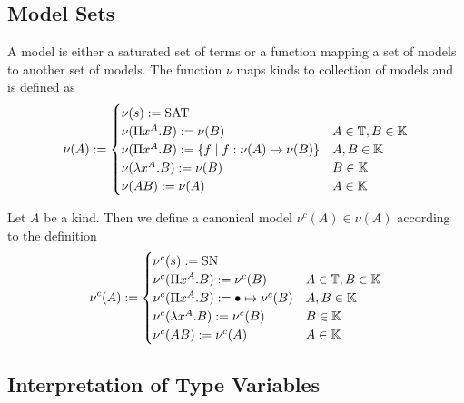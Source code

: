 \subsection{Model Sets}

\begin{definition}
  A model is either a saturated set of terms or a function mapping a set of
  models to another set of models. The function $\nu$ maps kinds to collection
  of models and is defined as
  $$
  \nu(A) :=
  \begin{cases}
    \nu(s) := \text{SAT}
    \\
    \nu(\Pi x^A.B) := \nu(B) & A \in \mathbb{T}, B \in \mathbb{K}
    \\
    \nu(\Pi x^A.B) := \{ f \mid f:\nu(A) \to \nu(B)\} & A,B \in \mathbb{K}
    \\
    \nu(\lambda x^A. B) := \nu(B)       & B \in \mathbb{K}
    \\
    \nu(A B) := \nu(A)                  & A \in \mathbb{K}
  \end{cases}
  $$
\end{definition}


\begin{definition}
  Let $A$ be a kind. Then we define a canonical model $\nu^c(A) \in \nu(A)$
  according to the definition
  $$
  \nu^c(A) :=
  \begin{cases}
    \nu^c(s) := \SN
    \\
    \nu^c(\Pi x^A. B) := \nu^c(B) & A \in \Types, B \in \Kinds
    \\
    \nu^c(\Pi x^A. B) := \bullet \mapsto \nu^c(B) & A,B \in \Kinds
    \\
    \nu^c(\lambda x^A. B) := \nu^c(B)       & B \in \Kinds
    \\
    \nu^c(A B) := \nu^c(A)                  & A \in \Kinds

  \end{cases}
  $$
\end{definition}



\subsection{Interpretation of Type Variables}

